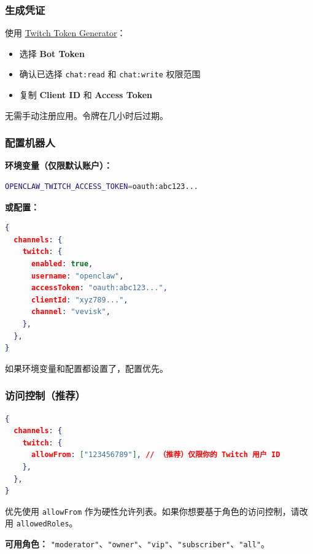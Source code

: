 \subsubsection{生成凭证}


使用 \href{https://twitchtokengenerator.com/}{Twitch Token Generator}：

\begin{itemize}
  \item 选择 \textbf{Bot Token}
  \item 确认已选择 \texttt{chat:read} 和 \texttt{chat:write} 权限范围
  \item 复制 \textbf{Client ID} 和 \textbf{Access Token}
\end{itemize}


无需手动注册应用。令牌在几小时后过期。

\subsubsection{配置机器人}


\textbf{环境变量（仅限默认账户）：}

\begin{lstlisting}[language=bash]
OPENCLAW_TWITCH_ACCESS_TOKEN=oauth:abc123...
\end{lstlisting}


\textbf{或配置：}

\begin{lstlisting}[language=json]
{
  channels: {
    twitch: {
      enabled: true,
      username: "openclaw",
      accessToken: "oauth:abc123...",
      clientId: "xyz789...",
      channel: "vevisk",
    },
  },
}
\end{lstlisting}


如果环境变量和配置都设置了，配置优先。

\subsubsection{访问控制（推荐）}


\begin{lstlisting}[language=json]
{
  channels: {
    twitch: {
      allowFrom: ["123456789"], // （推荐）仅限你的 Twitch 用户 ID
    },
  },
}
\end{lstlisting}


优先使用 \texttt{allowFrom} 作为硬性允许列表。如果你想要基于角色的访问控制，请改用 \texttt{allowedRoles}。

\textbf{可用角色：} \texttt{"moderator"}、\texttt{"owner"}、\texttt{"vip"}、\texttt{"subscriber"}、\texttt{"all"}。


